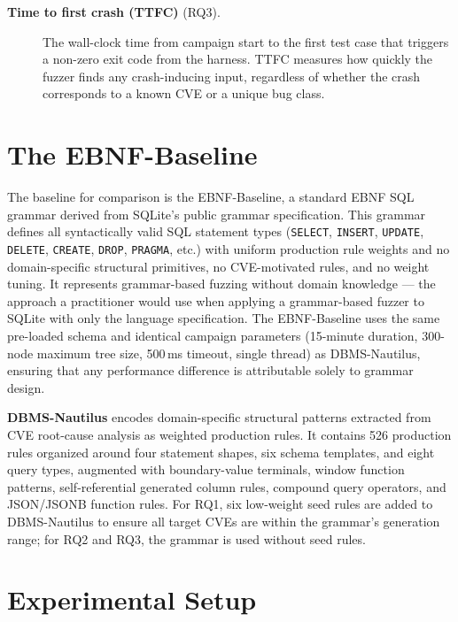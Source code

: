 \begin{description}
  \item[\textbf{Time to first crash (TTFC)} (RQ3).] The wall-clock time from campaign start to the first test case that triggers a non-zero exit code from the harness. TTFC measures how quickly the fuzzer finds any crash-inducing input, regardless of whether the crash corresponds to a known CVE or a unique bug class.
\end{description}









\section{The EBNF-Baseline}
\label{sec:baselines}

The baseline for comparison is the EBNF-Baseline, a standard EBNF SQL grammar derived from SQLite's public grammar specification. This grammar defines all syntactically valid SQL statement types (\texttt{SELECT}, \texttt{INSERT}, \texttt{UPDATE}, \texttt{DELETE}, \texttt{CREATE}, \texttt{DROP}, \texttt{PRAGMA}, etc.) with uniform production rule weights and no domain-specific structural primitives, no CVE-motivated rules, and no weight tuning. It represents grammar-based fuzzing without domain knowledge --- the approach a practitioner would use when applying a grammar-based fuzzer to SQLite with only the language specification. The EBNF-Baseline uses the same pre-loaded schema and identical campaign parameters (15-minute duration, 300-node maximum tree size, 500\,ms timeout, single thread) as DBMS-Nautilus, ensuring that any performance difference is attributable solely to grammar design.

\textbf{DBMS-Nautilus} encodes domain-specific structural patterns extracted from CVE root-cause analysis as weighted production rules. It contains 526 production rules organized around four statement shapes, six schema templates, and eight query types, augmented with boundary-value terminals, window function patterns, self-referential generated column rules, compound query operators, and JSON/JSONB function rules. For RQ1, six low-weight seed rules are added to DBMS-Nautilus to ensure all target CVEs are within the grammar's generation range; for RQ2 and RQ3, the grammar is used without seed rules.




\section{Experimental Setup}
\label{sec:setup}

